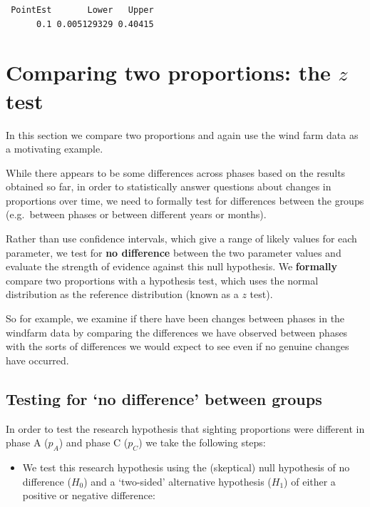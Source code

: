 \documentclass[
  oneside]{krantz}
\providecommand{\tightlist}{%
  \setlength{\itemsep}{0pt}\setlength{\parskip}{0pt}}
\begin{document}
\begin{verbatim}
 PointEst       Lower   Upper
      0.1 0.005129329 0.40415
\end{verbatim}

\hypertarget{comparing-two-proportions-the-z-test}{%
\section{\texorpdfstring{Comparing two proportions: the \(z\) test}{Comparing two proportions: the z test}}\label{comparing-two-proportions-the-z-test}}

In this section we compare two proportions and again use the wind farm data as a motivating example.

While there appears to be some differences across phases based on the results obtained so far, in order to statistically answer questions about changes in proportions over time, we need to formally test for differences between the groups (e.g.~between phases or between different years or months).

Rather than use confidence intervals, which give a range of likely values for each parameter, we test for \textbf{no difference} between the two parameter values and evaluate the strength of evidence against this null hypothesis. We \textbf{formally} compare two proportions with a hypothesis test, which uses the normal distribution as the reference distribution (known as a \(z\) test).

So for example, we examine if there have been changes between phases in the windfarm data by comparing the differences we have observed between phases with the sorts of differences we would expect to see even if no genuine changes have occurred.

\hypertarget{testing-for-no-difference-between-groups}{%
\subsection{Testing for `no difference' between groups}\label{testing-for-no-difference-between-groups}}

In order to test the research hypothesis that sighting proportions were different in phase A (\(p_{A}\)) and phase C (\(p_{C}\)) we take the following steps:

\begin{itemize}
\tightlist
\item
  We test this research hypothesis using the (skeptical) null hypothesis of no difference (\(H_0\)) and a `two-sided' alternative hypothesis (\(H_1\)) of either a positive or negative difference:
\end{itemize}
\end{document}
